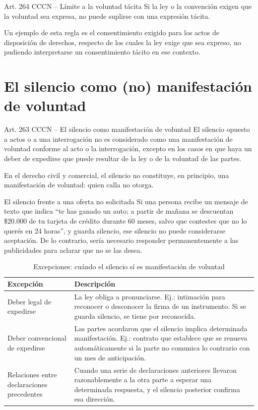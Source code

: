 \documentclass[12pt,oneside]{book}
\begin{document}
\begin{definition}{Art. 264 CCCN -- Límite a la voluntad tácita}
Si la ley o la convención exigen que la voluntad sea expresa, no puede suplirse con una expresión tácita.
\end{definition}

Un ejemplo de esta regla es el consentimiento exigido para los actos de disposición de derechos, respecto de los cuales la ley exige que sea expreso, no pudiendo interpretarse un consentimiento tácito en ese contexto.

\section{El silencio como (no) manifestación de voluntad}

\begin{definition}{Art. 263 CCCN -- El silencio como manifestación de voluntad}
El silencio opuesto a actos o a una interrogación no es considerado como una manifestación de voluntad conforme al acto o la interrogación, excepto en los casos en que haya un deber de expedirse que puede resultar de la ley o de la voluntad de las partes.
\end{definition}

En el derecho civil y comercial, el silencio no constituye, en principio, una manifestación de voluntad: quien calla no otorga.

\begin{example}{El silencio frente a una oferta no solicitada}
Si una persona recibe un mensaje de texto que indica ``te has ganado un auto; a partir de mañana se descuentan \$20.000 de tu tarjeta de crédito durante 60 meses, salvo que contestes que no lo querés en 24 horas'', y guarda silencio, ese silencio no puede considerarse aceptación. De lo contrario, sería necesario responder permanentemente a las publicidades para aclarar que no se las desea.
\end{example}

\begin{table}[H]
\centering
\caption{Excepciones: cuándo el silencio sí es manifestación de voluntad}
\begin{tabularx}{\textwidth}{l X}
\toprule
\textbf{Excepción} & \textbf{Descripción} \\
\midrule
Deber legal de expedirse & La ley obliga a pronunciarse. Ej.: intimación para reconocer o desconocer la firma de un instrumento. Si se guarda silencio, se tiene por reconocida. \\
Deber convencional de expedirse & Las partes acordaron que el silencio implica determinada manifestación. Ej.: contrato que establece que se renueva automáticamente si la parte no comunica lo contrario con un mes de anticipación. \\
Relaciones entre declaraciones precedentes & Cuando una serie de declaraciones anteriores llevaron razonablemente a la otra parte a esperar una determinada respuesta, y el silencio posterior confirma esa dirección. \\
\bottomrule
\end{tabularx}
\end{table}
\end{document}

